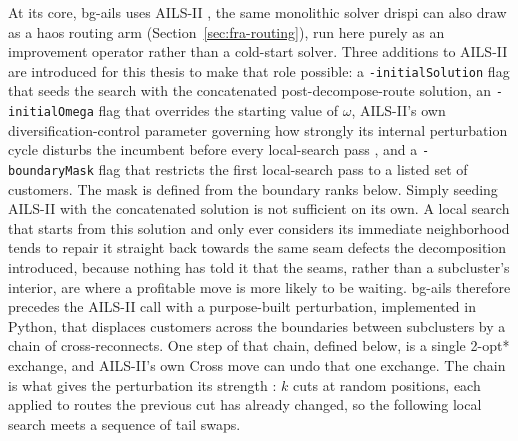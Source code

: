 At its core, \gls{bg-ails} uses AILS-II \citep{maximoAILSIIAdaptiveIterated2024}, the same monolithic solver \gls{drispi} can also draw as a \gls{haos} routing arm (Section~\ref{sec:fra-routing}), run here purely as an improvement operator rather than a cold-start solver. Three additions to AILS-II are introduced for this thesis to make that role possible: a \texttt{-initialSolution} flag that seeds the search with the concatenated post-decompose-route solution, an \texttt{-initialOmega} flag that overrides the starting value of $\omega$, AILS-II's own diversification-control parameter governing how strongly its internal perturbation cycle disturbs the incumbent before every local-search pass \citep{maximoHybridAdaptiveIterated2021}, and a \texttt{-boundaryMask} flag that restricts the first local-search pass to a listed set of customers. The mask is defined from the boundary ranks below. Simply seeding AILS-II with the concatenated solution is not sufficient on its own. A local search that starts from this solution and only ever considers its immediate neighborhood tends to repair it straight back towards the same seam defects the decomposition introduced, because nothing has told it that the seams, rather than a subcluster's interior, are where a profitable move is more likely to be waiting. \gls{bg-ails} therefore precedes the AILS-II call with a purpose-built perturbation, implemented in Python, that displaces customers across the boundaries between subclusters by a chain of cross-reconnects. One step of that chain, defined below, is a single 2-opt* exchange, and AILS-II's own Cross move can undo that one exchange. The chain is what gives the perturbation its strength \citep{lourencoIteratedLocalSearch2003}: $k$ cuts at random positions, each applied to routes the previous cut has already changed, so the following local search meets a sequence of tail swaps.

